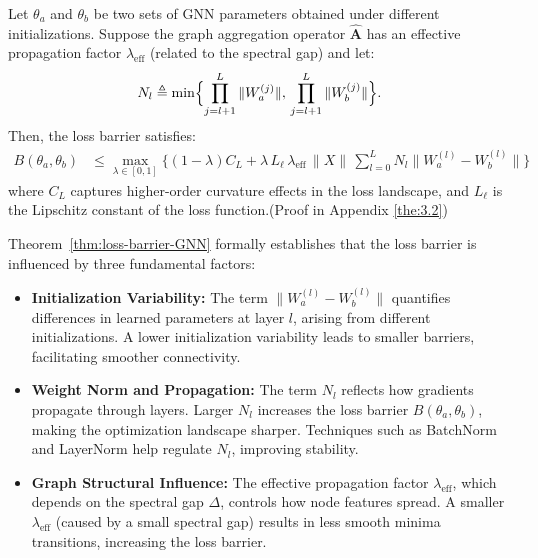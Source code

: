 \begin{theorem}
\label{thm:loss-barrier-GNN}
Let \(\theta_a\) and \(\theta_b\) be two sets of GNN parameters obtained under different initializations. Suppose the graph aggregation operator \(\hat{\mathbf{A}}\) has an effective propagation factor \(\lambda_{\mathrm{eff}}\) (related to the spectral gap) and let:
\[
N_l \triangleq \min\Bigl\{ \prod_{j=l+1}^{L} \|W_a^{(j)}\|,\,\prod_{j=l+1}^{L} \|W_b^{(j)}\| \Bigr\}.
\]
Then, the loss barrier satisfies:
\begin{equation}
\label{eq:final-bound}
\begin{aligned}
    B(\theta_a,\theta_b) &\le \max_{\lambda \in [0,1]} \Bigg\{ 
    (1-\lambda) C_L + \lambda\,L_\ell\,\lambda_{\mathrm{eff}}\,\|X\|\,\sum_{l=0}^{L} N_l  \|W_a^{(l)}-W_b^{(l)}\| 
    \Bigg\}
\end{aligned}
\end{equation}
where \(C_L\) captures higher-order curvature effects in the loss landscape, and \(L_\ell\) is the Lipschitz constant of the loss function.(Proof in Appendix \ref{the:3.2})
\end{theorem}


\begin{remark}
Theorem~\ref{thm:loss-barrier-GNN} formally establishes that the loss barrier is influenced by three fundamental factors:
\begin{itemize}
    \item \textbf{Initialization Variability:} The term 
    \(
    \|W_a^{(l)}-W_b^{(l)}\|
    \)
    quantifies differences in learned parameters at layer \(l\), arising from different initializations. A lower initialization variability leads to smaller barriers, facilitating smoother connectivity.
    \item \textbf{Weight Norm and Propagation:} The term \( N_l \) reflects how gradients propagate through layers. Larger \( N_l \) increases the loss barrier \( B(\theta_a, \theta_b) \), making the optimization landscape sharper. Techniques such as BatchNorm and LayerNorm help regulate \( N_l \), improving stability.~\cite{luo2024classic}
    \item \textbf{Graph Structural Influence:} The effective propagation factor \(\lambda_{\mathrm{eff}}\), which depends on the spectral gap \(\Delta\), controls how node features spread. A smaller \(\lambda_{\mathrm{eff}}\) (caused by a small spectral gap) results in less smooth minima transitions, increasing the loss barrier.
\end{itemize}
\end{remark}


